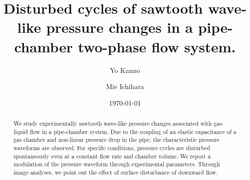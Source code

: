\documentclass[aps,pre,preprint,groupedaddress,showkeys]{revtex4-2}
\begin{document}

\title{Disturbed cycles of sawtooth wave-like pressure changes in a pipe-chamber two-phase flow system.}


\author{Yo Kanno}

\author{Mie Ichihara}



\date{\today}
\begin{abstract}
We study experimentally sawtooth wave-like pressure changes associated with gas-liquid flow in a pipe-chamber system.
Due to the coupling of an elastic capacitance of a gas chamber and non-linear pressure drop in the pipe, the characteristic pressure waveforms are observed.
For specific conditions, pressure cycles are disturbed spontaneously even at a constant flow rate and chamber volume.
We report a modulation of the pressure waveform through experimental parameters.  
Through image analyses, we point out the effect of surface disturbance of downward flow.
\end{abstract}

\end{document}
